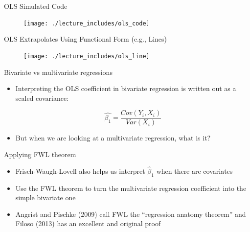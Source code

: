 \documentclass{beamer}
\begin{document}
\begin{frame}{OLS Simulated Code}

\begin{figure}[!t]\centering
\texttt{[image: ./lecture\_includes/ols\_code]}
\end{figure}

\end{frame}

\begin{frame}{OLS Extrapolates Using Functional Form (e.g., Lines)}

\begin{figure}[!t]\centering
\texttt{[image: ./lecture\_includes/ols\_line]}
\end{figure}

\end{frame}

\begin{frame}{Bivariate vs multivariate regressions}

\begin{itemize}

\item Interpreting the OLS coefficient in bivariate regression is written out as a scaled covariance:

 $$\widehat{\beta_1}=\frac{Cov(Y_i,X_i)}{Var(X_i)}$$
 
 \item But when we are looking at a multivariate regression, what is it?
 
 \end{itemize}
 
 \end{frame}
 
 \begin{frame}{Applying FWL theorem}

\begin{itemize}
\item Frisch-Waugh-Lovell also helps us interpret $\widehat{\beta}_1$ when there are covariates
 \item Use the FWL theorem to turn the multivariate regression coefficient into the simple bivariate one
\item Angrist and Pischke (2009) call FWL the ``regression anatomy theorem'' and Filoso (2013) has an excellent and original proof
\end{itemize}

\end{frame}
\end{document}
